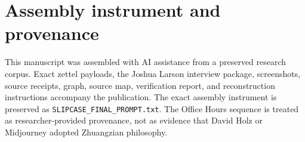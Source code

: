 \documentclass[11pt]{article}
\begin{document}
\appendix
\section{Assembly instrument and provenance}
This manuscript was assembled with AI assistance from a preserved research corpus. Exact zettel payloads, the Joshua Larson interview package, screenshots, source receipts, graph, source map, verification report, and reconstruction instructions accompany the publication. The exact assembly instrument is preserved as \texttt{SLIPCASE\_FINAL\_PROMPT.txt}. The Office Hours sequence is treated as researcher-provided provenance, not as evidence that David Holz or Midjourney adopted Zhuangzian philosophy.
\end{document}

